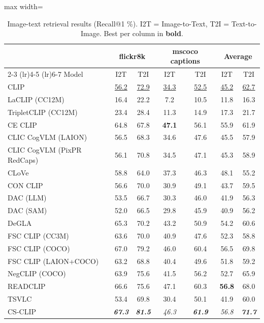 \begin{table}[t]
  \centering
  \scriptsize
  \caption{Image-text retrieval results (Recall@1 \%). I2T = Image-to-Text, T2I = Text-to-Image. Best per column in \textbf{bold}.}
  \label{tab:downstream_retrieval}
  \begin{adjustbox}{max width=\textwidth}
  \setlength{\tabcolsep}{3pt}
  \begin{tabular}{lcccccc}
    \toprule
     & \multicolumn{2}{c}{flickr8k} & \multicolumn{2}{c}{mscoco captions} & \multicolumn{2}{c}{Average} \\
    \cmidrule(lr){2-3} \cmidrule(lr){4-5} \cmidrule(lr){6-7}
    Model & I2T & T2I & I2T & T2I & I2T & T2I \\
    \midrule
    CLIP & \underline{56.2} & \underline{72.9} & \underline{34.3} & \underline{52.5} & \underline{45.2} & \underline{62.7} \\
    \midrule
    LaCLIP (CC12M) & 16.4 & 22.2 & 7.2 & 10.5 & 11.8 & 16.3 \\
    TripletCLIP (CC12M) & 23.4 & 28.4 & 11.3 & 14.9 & 17.3 & 21.7 \\
    \midrule
    CE CLIP & 64.8 & 67.8 & \textbf{47.1} & 56.1 & 55.9 & 61.9 \\
    CLIC CogVLM (LAION) & 56.5 & 68.3 & 34.6 & 47.6 & 45.5 & 57.9 \\
    CLIC CogVLM (PixPR RedCaps) & 56.1 & 70.8 & 34.5 & 47.1 & 45.3 & 58.9 \\
    CLoVe & 58.8 & 64.0 & 37.3 & 46.3 & 48.1 & 55.2 \\
    CON CLIP & 56.6 & 70.0 & 30.9 & 49.1 & 43.7 & 59.5 \\
    DAC (LLM) & 53.5 & 66.7 & 30.3 & 46.0 & 41.9 & 56.3 \\
    DAC (SAM) & 52.0 & 66.5 & 29.8 & 45.9 & 40.9 & 56.2 \\
    DeGLA & 65.3 & 70.2 & 43.2 & 50.9 & 54.2 & 60.6 \\
    FSC CLIP (CC3M) & 63.6 & 70.0 & 40.9 & 47.6 & 52.3 & 58.8 \\
    FSC CLIP (COCO) & 67.0 & 79.2 & 46.0 & 60.4 & 56.5 & 69.8 \\
    FSC CLIP (LAION+COCO) & 63.2 & 68.8 & 40.4 & 49.6 & 51.8 & 59.2 \\
    NegCLIP (COCO) & 63.9 & 75.6 & 41.5 & 56.2 & 52.7 & 65.9 \\
    READCLIP & 66.6 & 75.6 & 47.1 & 60.3 & \textbf{56.8} & 68.0 \\
    TSVLC & 53.4 & 69.8 & 30.4 & 50.1 & 41.9 & 60.0 \\
    \midrule
    CS-CLIP & \emph{\textbf{67.3}} & \emph{\textbf{81.5}} & \emph{46.3} & \emph{\textbf{61.9}} & \emph{56.8} & \emph{\textbf{71.7}} \\
    \bottomrule
  \end{tabular}
  \end{adjustbox}
\end{table}